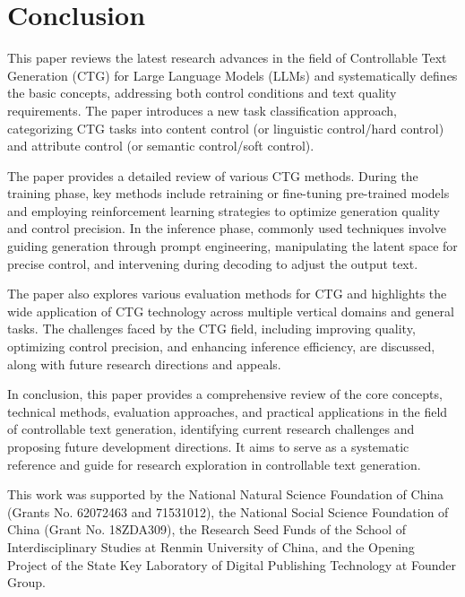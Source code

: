 \documentclass[acmsmall, screen]{acmart}
\begin{document}
\section{Conclusion}
\label{sec:conclusion}

This paper reviews the latest research advances in the field of Controllable Text Generation (CTG) for Large Language Models (LLMs) and systematically defines the basic concepts, addressing both control conditions and text quality requirements. The paper introduces a new task classification approach, categorizing CTG tasks into content control (or linguistic control/hard control) and attribute control (or semantic control/soft control).

The paper provides a detailed review of various CTG methods. During the training phase, key methods include retraining or fine-tuning pre-trained models and employing reinforcement learning strategies to optimize generation quality and control precision. In the inference phase, commonly used techniques involve guiding generation through prompt engineering, manipulating the latent space for precise control, and intervening during decoding to adjust the output text.

The paper also explores various evaluation methods for CTG and highlights the wide application of CTG technology across multiple vertical domains and general tasks. The challenges faced by the CTG field, including improving quality, optimizing control precision, and enhancing inference efficiency, are discussed, along with future research directions and appeals.

In conclusion, this paper provides a comprehensive review of the core concepts, technical methods, evaluation approaches, and practical applications in the field of controllable text generation, identifying current research challenges and proposing future development directions. It aims to serve as a systematic reference and guide for research exploration in controllable text generation.

\begin{acks}
This work was supported by the National Natural Science Foundation of China (Grants No. 62072463 and 71531012), the National Social Science Foundation of China (Grant No. 18ZDA309), the Research Seed Funds of the School of Interdisciplinary Studies at Renmin University of China, and the Opening Project of the State Key Laboratory of Digital Publishing Technology at Founder Group. 
\end{acks}





\appendix
\end{document}
